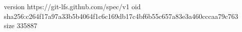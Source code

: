 version https://git-lfs.github.com/spec/v1
oid sha256:c264f17a97a33b5b4064f1c6c169db17c4bf6b55c657a83e3a460cccaa79c763
size 335887
